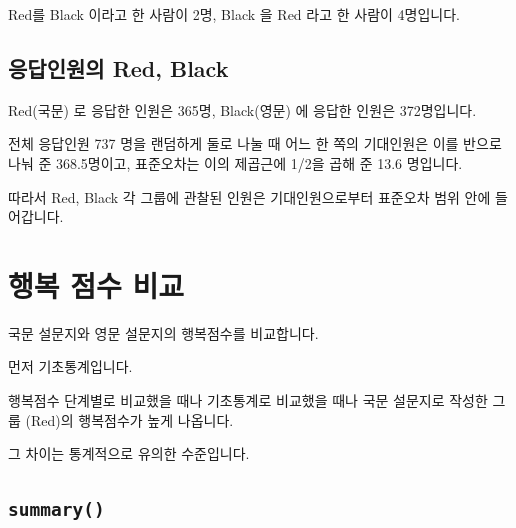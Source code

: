 \documentclass[
]{book}
\begin{document}
Red를 Black 이라고 한 사람이 2명, Black 을 Red 라고 한 사람이 4명입니다.

\subsection{응답인원의 Red, Black}\label{uxc751uxb2f5uxc778uxc6d0uxc758-red-black-9}

Red(국문) 로 응답한 인원은 365명, Black(영문) 에 응답한 인원은 372명입니다.

전체 응답인원 737 명을 랜덤하게 둘로 나눌 때 어느 한 쪽의 기대인원은 이를 반으로 나눠 준 368.5명이고, 표준오차는 이의 제곱근에 1/2을 곱해 준 13.6 명입니다.

따라서 Red, Black 각 그룹에 관찰된 인원은 기대인원으로부터 표준오차 범위 안에 들어갑니다.

\section{행복 점수 비교}\label{uxd589uxbcf5-uxc810uxc218-uxbe44uxad50}

국문 설문지와 영문 설문지의 행복점수를 비교합니다.

먼저 기초통계입니다.

행복점수 단계별로 비교했을 때나 기초통계로 비교했을 때나 국문 설문지로 작성한 그룹 (Red)의 행복점수가 높게 나옵니다.

그 차이는 통계적으로 유의한 수준입니다.

\subsection{\texorpdfstring{\texttt{summary()}}{summary()}}\label{summary-1}
\end{document}
